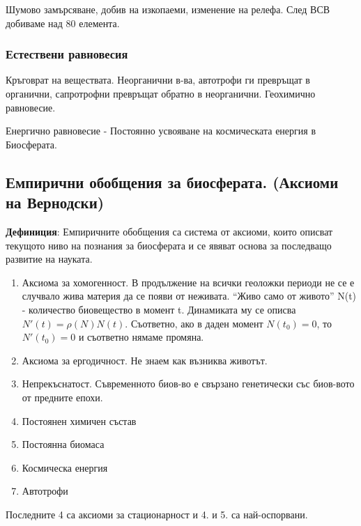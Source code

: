\documentclass[12pt, a4paper]{article}
\begin{document}
Шумово замърсяване, добив на изкопаеми, изменение на релефа. След ВСВ добиваме над 80 елемента.

\subsubsection*{Естествени равновесия}
Кръговрат на веществата.
Неорганични в-ва, автотрофи ги превръщат в органични, сапротрофни превръщат обратно в неорганични. Геохимично равновесие.

Енергично равновесие - Постоянно усвояване на космическата енергия в Биосферата.

\subsection*{Емпирични обобщения за биосферата. (Аксиоми на Вернодски)}

\textbf{Дефиниция}: Емпиричните обобщения са система от аксиоми, които описват текущото ниво на познания за биосферата и се явяват основа за последващо развитие на науката.
\begin{enumerate}
	\item Аксиома за хомогенност.
	В продължение на всички геоложки периоди не се е случвало жива материя да се появи от неживата. ``Живо само от живото''
	N(t) - количество биовещество в момент t. Динамиката му се описва $N'(t) = \rho(N)N(t)$. Съответно, ако в даден момент $N(t_0)=0$, то $N'(t_0) = 0$ и съответно нямаме промяна.
	\item Аксиома за ергодичност.
	Не знаем как възниква животът.
	\item Непрекъснатост. 
	Съвременното биов-во е свързано генетически със биов-вото от предните епохи.
	\item Постоянен химичен състав
	\item Постоянна биомаса
	\item Космическа енергия
	\item Автотрофи
\end{enumerate}
Последните 4 са аксиоми за стационарност и 4. и 5. са най-оспорвани.
\end{document}
